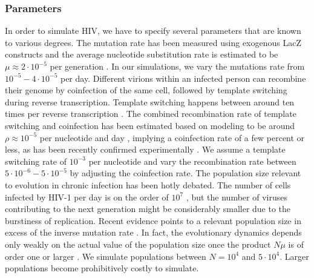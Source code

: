 \documentclass[11pt]{article}
\begin{document}
\subsubsection*{Parameters}
In order to simulate HIV, we have to specify several parameters that are
known to various degrees. The mutation rate has been measured using
exogenous LacZ constructs and the average nucleotide substitution rate is 
estimated to be $\mu\approx 2 \cdot 10^{-5}$ per generation \citep{mansky_lower_1995,
abram_nature_2010}. In our simulations, we vary the mutations rate
from $10^{-5} - 4\cdot 10^{-5}$ per day. Different virions within an
infected person can recombine their genome by coinfection of the same
cell, followed by template switching during reverse transcription. 
Template switching happens between around ten times per reverse
transcription \citep{levy_dynamics_2004}. The combined recombination rate of template
switching and coinfection has been estimated based on modeling to be around $\rho\approx
10^{-5}$ per nucleotide and day
\citep{neher_recombination_2010,batorsky_estimate_2011}, implying a
coinfection rate of a few percent or less, as has been recently
confirmed experimentally \citep{josefsson_single_2013}. We assume a
template switching rate of $10^{-3}$ per nucleotide and vary the
recombination rate between $5\cdot 10^{-6}- 5\cdot 10^{-5}$ by adjusting the
coinfection rate. The population size relevant to evolution in chronic
infection has been hotly debated. The number of cells infected by HIV-1
per day is on the order of $10^{7}$ \citep{perelson_hiv-1_1996}, but the
number of viruses contributing to the next generation might be
considerably smaller due to the burstiness of replication. 
Recent evidence points to a relevant population
size in excess of the inverse mutation rate
\citep{boltz_ultrasensitive_2012}. In fact, the evolutionary dynamics
depends only weakly on the actual value of the population size once the
product $N\mu$ is of order one or larger \citep{neher_genetic_2011}. We
simulate populations between $N=10^4$ and $5 \cdot 10^4$. Larger populations
become prohibitively costly to simulate.
\end{document}
